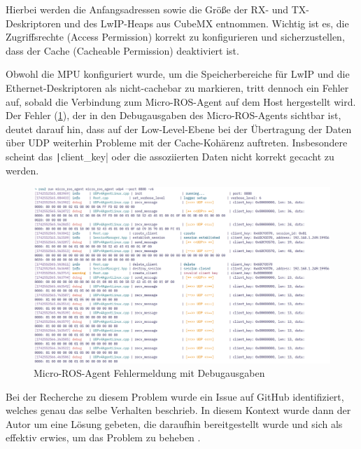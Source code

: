 Hierbei werden die Anfangsadressen sowie die Größe der RX- und TX-Deskriptoren
und des LwIP-Heaps aus CubeMX entnommen. Wichtig ist es, die Zugriffsrechte
(Access Permission) korrekt zu konfigurieren und sicherzustellen, dass der Cache
(Cacheable Permission) deaktiviert ist.

Obwohl die MPU konfiguriert wurde, um die Speicherbereiche für LwIP und die
Ethernet-Deskriptoren als nicht-cachebar zu markieren, tritt dennoch ein Fehler
auf, sobald die Verbindung zum Micro-ROS-Agent auf dem Host hergestellt wird.
Der Fehler (\ref{fig:micro_ros_err}), der in den Debugausgaben des
Micro-ROS-Agents sichtbar ist, deutet darauf hin, dass auf der Low-Level-Ebene
bei der Übertragung der Daten über UDP weiterhin Probleme mit der Cache-Kohärenz
auftreten. Insbesondere scheint das \texttt|client_key| oder die
assoziierten Daten nicht korrekt gecacht zu werden.

\begin{figure}[htb]
    \centering
    \includegraphics[width=1\textwidth]{assets/micro_ros_agent_err}
    \caption{Micro-ROS-Agent Fehlermeldung mit Debugausgaben}
    \label{fig:micro_ros_err}
\end{figure}

Bei der Recherche zu diesem Problem wurde ein Issue auf GitHub identifiziert,
welches genau das selbe Verhalten beschrieb. In diesem Kontext wurde dann der
Autor um eine Lösung gebeten, die daraufhin bereitgestellt wurde und sich als
effektiv erwies, um das Problem zu beheben \cite{microROS_STM32CubeMX_Issue139}.


